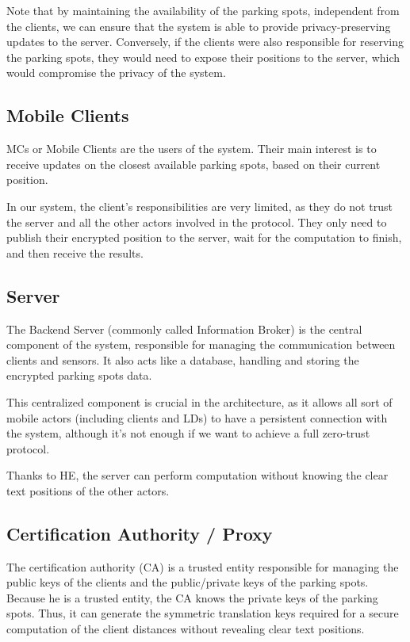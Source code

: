 Note that by maintaining the availability of the parking spots, independent from the clients, we can ensure that the system is able to provide privacy-preserving updates to the server. Conversely, if the clients were also responsible for reserving the parking spots, they would need to expose their positions to the server, which would compromise the privacy of the system.

\subsection{Mobile Clients}
MCs or Mobile Clients are the users of the system. Their main interest is to receive updates on the closest available parking spots, based on their current position. 

In our system, the client's responsibilities are very limited, as they do not trust the server and all the other actors involved in the protocol. They only need to publish their encrypted position to the server, wait for the computation to finish, and then receive the results.

\subsection{Server}
The Backend Server (commonly called Information Broker) is the central component of the system, responsible for managing the communication between clients and sensors. It also acts like a database, handling and storing the encrypted parking spots data.

This centralized component is crucial in the architecture, as it allows all sort of mobile actors (including clients and LDs) to have a persistent connection with the system, although it's not enough if we want to achieve a full zero-trust protocol.

Thanks to HE, the server can perform computation without knowing the clear text positions of the other actors.

\subsection{Certification Authority / Proxy}
The certification authority (CA) is a trusted entity responsible for managing the public keys of the clients and the public/private keys of the parking spots. Because he is a trusted entity, the CA knows the private keys of the parking spots. Thus, it can generate the symmetric translation keys required for a secure computation of the client distances without revealing clear text positions.

